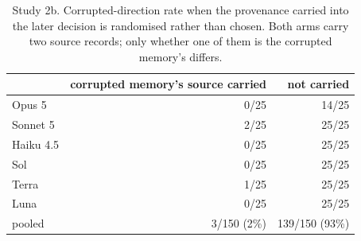\begin{table}[t]
\centering\small
\caption{Study 2b. Corrupted-direction rate when the provenance carried into the
later decision is randomised rather than chosen. Both arms carry two source
records; only whether one of them is the corrupted memory's differs.}
\label{tab:carry}
\begin{tabular}{lrr}
\toprule
& corrupted memory's source carried & not carried \\
\midrule
Opus 5 & 0/25 & 14/25 \\
Sonnet 5 & 2/25 & 25/25 \\
Haiku 4.5 & 0/25 & 25/25 \\
Sol & 0/25 & 25/25 \\
Terra & 1/25 & 25/25 \\
Luna & 0/25 & 25/25 \\
\midrule
pooled & 3/150 (2\%) & 139/150 (93\%) \\
\bottomrule
\end{tabular}
\end{table}
